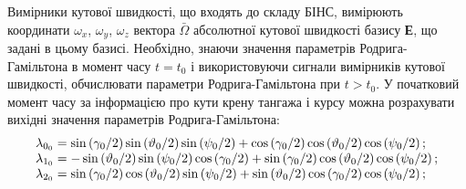 Вимірники кутової швидкості, що входять до складу БІНС, вимірюють координати 
$\omega_{x}$, $\omega_{y}$, $\omega_{z}$ вектора $\bar{\Omega }$ абсолютної кутової швидкості 
базису \textbf{Е}, що задані в цьому базисі. Необхідно, знаючи значення параметрів 
Родрига-Гамільтона в момент часу $t=t_{0} $ і використовуючи сигнали вимірників кутової 
швидкості, обчислювати параметри Родрига-Гамільтона при $t>t_{0} $. У початковий 
момент часу за інформацією про кути крену тангажа і курсу можна розрахувати вихідні 
значення параметрів Родрига-Гамільтона: 
\[\begin{array}{l} 
{\lambda_{0_{0} } =\sin  \left({\gamma_{0}  \mathord{
\left/{\vphantom{\gamma_{0}  2}}\right.\kern-\nulldelimiterspace} 2} \right)\sin 
 \left({\vartheta_{0}  \mathord{\left/{\vphantom{\vartheta_{0}  2}}\right.\kern-
\nulldelimiterspace} 2} \right)\sin  \left({\psi_{0}  \mathord{\left/{\vphantom{
\psi_{0}  2}}\right.\kern-\nulldelimiterspace} 2} \right)+\cos  \left({\gamma 
_{0}  \mathord{\left/{\vphantom{\gamma_{0}  2}}\right.\kern-\nulldelimiterspace} 
2} \right)\cos  \left({\vartheta_{0}  \mathord{\left/{\vphantom{\vartheta_{0}  
2}}\right.\kern-\nulldelimiterspace} 2} \right)\cos  \left({\psi_{0}  \mathord{
\left/{\vphantom{\psi_{0}  2}}\right.\kern-\nulldelimiterspace} 2} \right);} \\ 

{\lambda_{1_{0} } =-\sin  \left({\vartheta_{0}  \mathord{\left/{\vphantom{
\vartheta_{0}  2}}\right.\kern-\nulldelimiterspace} 2} \right)\sin  \left({\psi 
_{0}  \mathord{\left/{\vphantom{\psi_{0}  2}}\right.\kern-\nulldelimiterspace} 2} 
\right)\cos  \left({\gamma_{0}  \mathord{\left/{\vphantom{\gamma_{0}  2}}\right.
\kern-\nulldelimiterspace} 2} \right)+\sin \left({\gamma_{0}  \mathord{\left/{\vphantom{
\gamma_{0}  2}}\right.\kern-\nulldelimiterspace} 2} \right)\cos  \left({\vartheta 
_{0}  \mathord{\left/{\vphantom{\vartheta_{0}  2}}\right.\kern-\nulldelimiterspace} 
2} \right)\cos  \left({\psi_{0}  \mathord{\left/{\vphantom{\psi_{0}  2}}\right.
\kern-\nulldelimiterspace} 2} \right);} \\ 

{\lambda_{2_{0} } =\sin \left({
\gamma_{0}  \mathord{\left/{\vphantom{\gamma_{0}  2}}\right.\kern-\nulldelimiterspace} 
2} \right)\cos  \left({\vartheta_{0}  \mathord{\left/{\vphantom{\vartheta_{0}  
2}}\right.\kern-\nulldelimiterspace} 2} \right)\sin  \left({\psi_{0}  \mathord{
\left/{\vphantom{\psi_{0}  2}}\right.\kern-\nulldelimiterspace} 2} \right)+\sin 
 \left({\vartheta_{0}  \mathord{\left/{\vphantom{\vartheta_{0}  2}}\right.\kern-
\nulldelimiterspace} 2} \right)\cos  \left({\gamma_{0}  \mathord{\left/{\vphantom{
\gamma_{0}  2}}\right.\kern-\nulldelimiterspace} 2} \right)\cos  \left({\psi_{0}  
\mathord{\left/{\vphantom{\psi_{0}  2}}\right.\kern-\nulldelimiterspace} 2} \right);}\\ 


\end{array}\]
